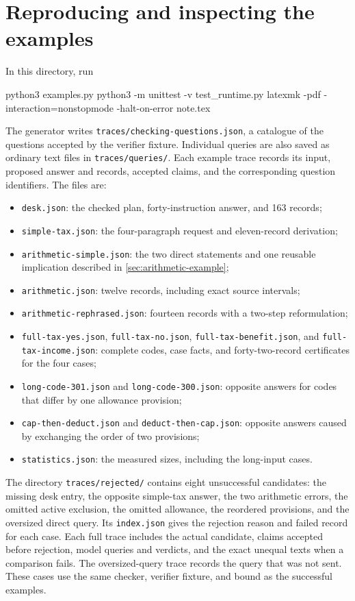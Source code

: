 \documentclass[11pt,twoside]{article}
\theoremstyle{definition}
\begin{document}
\section{Reproducing and inspecting the examples}
In this directory, run
\begin{code}
python3 examples.py
python3 -m unittest -v test_runtime.py
latexmk -pdf -interaction=nonstopmode -halt-on-error note.tex
\end{code}
The generator writes \texttt{traces/checking-questions.json}, a catalogue of
the \VerifierQuestionCount{} questions accepted by the verifier fixture. Individual
queries are also saved as ordinary text files in \texttt{traces/queries/}. Each example trace records its
input, proposed answer and records, accepted claims, and the corresponding
question identifiers. The files are:
\begin{itemize}[leftmargin=*]
\item \texttt{desk.json}: the checked plan, forty-instruction answer, and 163 records;
\item \texttt{simple-tax.json}: the four-paragraph request and eleven-record derivation;
\item \texttt{arithmetic-simple.json}: the two direct statements and one
reusable implication described in \cref{sec:arithmetic-example};
\item \texttt{arithmetic.json}: twelve records, including exact source intervals;
\item \texttt{arithmetic-rephrased.json}: fourteen records with a two-step reformulation;
\item \texttt{full-tax-yes.json}, \texttt{full-tax-no.json},
\texttt{full-tax-benefit.json}, and \texttt{full-tax-income.json}: complete codes,
case facts, and forty-two-record certificates for the four cases;
\item \texttt{long-code-301.json} and \texttt{long-code-300.json}: opposite
answers for codes that differ by one allowance provision;
\item \texttt{cap-then-deduct.json} and \texttt{deduct-then-cap.json}: opposite
answers caused by exchanging the order of two provisions;
\item \texttt{statistics.json}: the measured sizes, including the long-input cases.
\end{itemize}

The directory \texttt{traces/rejected/} contains eight unsuccessful candidates:
the missing desk entry, the opposite simple-tax answer, the two arithmetic
errors, the omitted active exclusion, the omitted allowance, the reordered
provisions, and the oversized direct query. Its \texttt{index.json} gives
the rejection reason and failed record for each case. Each full trace
includes the actual candidate, claims accepted before rejection, model
queries and verdicts, and the exact unequal texts when a comparison fails.
The oversized-query trace records the query that was not sent. These cases
use the same checker, verifier fixture, and bound as the successful examples.
\end{document}
